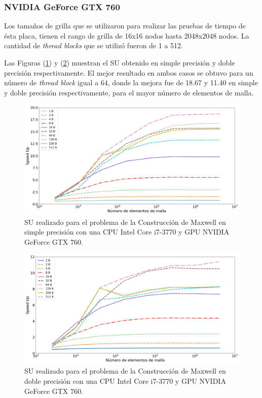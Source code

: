 \subsubsection{NVIDIA GeForce GTX 760}

Los tamaños de grilla que se utilizaron para realizar las pruebas de tiempo de ésta placa, tienen el rango de grilla de 16x16 nodos hasta 2048x2048 nodos. La cantidad de \textit{thread blocks} que se utilizó fueron de 1 a 512.

Las Figuras (\ref{fig:s_760_MxC_simple_1.0}) y (\ref{fig:s_760_MxC_double_1.0}) muestran el SU obtenido en simple precisión y doble precisión respectivamente. El mejor resultado en ambos casos se obtuvo para un número de \textit{thread block} igual a 64, donde la mejora fue de 18.67 y 11.40 en simple y doble precisión respectivamente, para el mayor número de elementos de malla.


\begin{figure}[htbp]
	\centering
	\includegraphics[width=\textwidth]{figs/cap4/s_760_MxC_simple_10}
	\caption{SU realizado para el problema de la Construcción de Maxwell en simple precisión con una CPU Intel Core i7-3770 y GPU NVIDIA GeForce GTX 760.} 
	\label{fig:s_760_MxC_simple_1.0}	
\end{figure}

\begin{figure}[htbp]
	\centering
	\includegraphics[width=\textwidth]{figs/cap4/s_760_MxC_double_10}
	\caption{SU realizado para el problema de la Construcción de Maxwell en doble precisión con una CPU Intel Core i7-3770 y GPU NVIDIA GeForce GTX 760.} 
	\label{fig:s_760_MxC_double_1.0}	
\end{figure}

